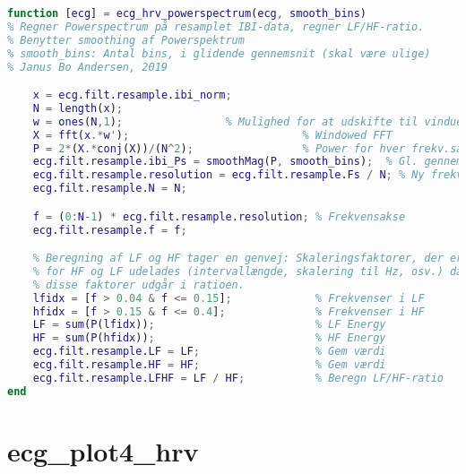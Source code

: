 \documentclass[a4paper]{report}
\begin{document}
        
\begin{lstlisting}[language=Matlab, style=Matlab-editor]
function [ecg] = ecg_hrv_powerspectrum(ecg, smooth_bins)
% Regner Powerspectrum på resamplet IBI-data, regner LF/HF-ratio.
% Benytter smoothing af Powerspektrum
% smooth_bins: Antal bins, i glidende gennemsnit (skal være ulige)
% Janus Bo Andersen, 2019

    x = ecg.filt.resample.ibi_norm;
    N = length(x);
    w = ones(N,1);                % Mulighed for at udskifte til vinduesfkt
    X = fft(x.*w');                           % Windowed FFT
    P = 2*(X.*conj(X))/(N^2);                 % Power for hver frekv.sample
    ecg.filt.resample.ibi_Ps = smoothMag(P, smooth_bins);  % Gl. gennemsnit
    ecg.filt.resample.resolution = ecg.filt.resample.Fs / N; % Ny frekv.opl
    ecg.filt.resample.N = N;

    f = (0:N-1) * ecg.filt.resample.resolution; % Frekvensakse
    ecg.filt.resample.f = f;

    % Beregning af LF og HF tager en genvej: Skaleringsfaktorer, der er ens
    % for HF og LF udelades (intervallængde, skalering til Hz, osv.) da
    % disse faktorer udgår i ratioen.
    lfidx = [f > 0.04 & f <= 0.15];             % Frekvenser i LF
    hfidx = [f > 0.15 & f <= 0.4];              % Frekvenser i HF
    LF = sum(P(lfidx));                         % LF Energy
    HF = sum(P(hfidx));                         % HF Energy
    ecg.filt.resample.LF = LF;                  % Gem værdi
    ecg.filt.resample.HF = HF;                  % Gem værdi
    ecg.filt.resample.LFHF = LF / HF;           % Beregn LF/HF-ratio
end
\end{lstlisting}



\section{ecg\_plot4\_hrv}
\end{document}
